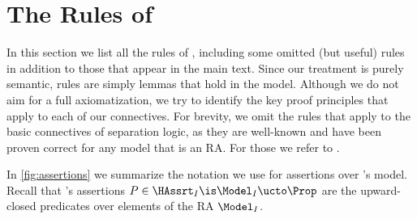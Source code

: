 \section{The Rules of \thelogic}
\label{sec:appendix:rules}

In this section we list all the rules of \thelogic,
including some omitted (but useful) rules in addition to those
that appear in the main text.
Since our treatment is purely semantic,
rules are simply lemmas that hold in the model.
Although we do not aim for a full axiomatization,
we try to identify the key proof principles that apply to each of our connectives.
For brevity, we omit the rules that apply to the basic connectives of separation logic, as they are well-known and have been proven correct for any model that is an RA. For those we refer to \cite{KrebbersJ0TKTCD18}.

In \cref{fig:assertions} we summarize the notation we use for
assertions over \thelogic's model.
Recall that \thelogic's assertions
$P \in \HAssrt_I \is \Model_I \ucto \Prop $
are the upward-closed predicates over elements of
the RA $\Model_I$.

